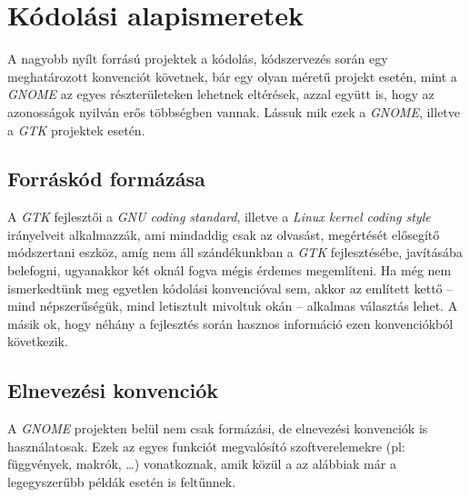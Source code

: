 \section{Kódolási alapismeretek}

A nagyobb nyílt forrású projektek a kódolás, kódszervezés során egy meghatározott konvenciót követnek, bár egy olyan méretű projekt esetén, mint a \textit{GNOME} az egyes részterületeken lehetnek eltérések, azzal együtt is, hogy az azonosságok nyilván erős többségben vannak. Lássuk mik ezek a \textit{GNOME}, illetve a \textit{GTK} projektek esetén.

\subsection{Forráskód formázása}

A \textit{GTK} fejlesztői a \textit{GNU coding standard}\cite{gnucodingstandards}, illetve a \textit{Linux kernel coding style}\cite{linuxcodingstyle} irányelveit alkalmazzák, ami mindaddig csak az olvasást, megértését elősegítő módszertani eszköz, amíg nem áll szándékunkban a \textit{GTK} fejlesztésébe, javításába belefogni, ugyanakkor két oknál fogva mégis érdemes megemlíteni. Ha még nem ismerkedtünk meg egyetlen kódolási konvencióval sem, akkor az említett kettő -- mind népszerűségük, mind letisztult mivoltuk okán -- alkalmas választás lehet. A másik ok, hogy néhány a fejlesztés során hasznos információ ezen konvenciókból következik.

\subsection{Elnevezési konvenciók}

A \textit{GNOME} projekten belül nem csak formázási, de elnevezési konvenciók is használatosak. Ezek az egyes funkciót megvalósító szoftverelemekre (pl: függvények, makrók, \dots) vonatkoznak, amik közül a az alábbiak már a legegyszerűbb példák esetén is feltűnnek.


